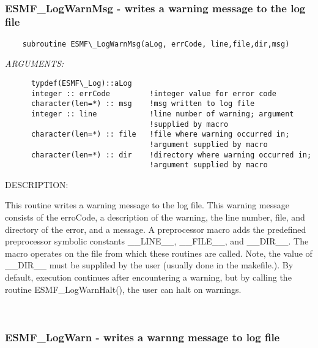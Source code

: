  
\mbox{}\hrulefill\ 
 

  \subsubsection [ESMF\_LogWarnMsg] {ESMF\_LogWarnMsg - writes a warning message to the log file}


  
\begin{verbatim}    subroutine ESMF\_LogWarnMsg(aLog, errCode, line,file,dir,msg)\end{verbatim}{\em ARGUMENTS:}
\begin{verbatim}      typdef(ESMF\_Log)::aLog
      integer :: errCode         !integer value for error code         
      character(len=*) :: msg    !msg written to log file
      integer :: line            !line number of warning; argument
                                 !supplied by macro
      character(len=*) :: file   !file where warning occurred in;
                                 !argument supplied by macro
      character(len=*) :: dir    !directory where warning occurred in;
                                 !argument supplied by macro\end{verbatim}
{\sf DESCRIPTION:\\ }


      This routine writes a warning message to the log file.  This warning
      message consists of the erroCode, a description of the warning, the 
      line number, file, and directory of the error, and a message. A 
      preprocessor macro adds the predefined preprocessor symbolic
      constants \_\_LINE\_\_, \_\_FILE\_\_, and \_\_DIR\_\_.
      The macro operates on
      the file from which these routines are called.  Note,
      the value of \_\_DIR\_\_ 
      must be suppliled by the user (usually done in
      the makefile.).  By default, execution continues after encountering
      a warning, but by calling the routine ESMF\_LogWarnHalt(), the user
      can halt on warnings.
   
 
\mbox{}\hrulefill\ 
 
\subsubsection [ESMF\_LogWarn] {ESMF\_LogWarn - writes a warnng message to log file}



